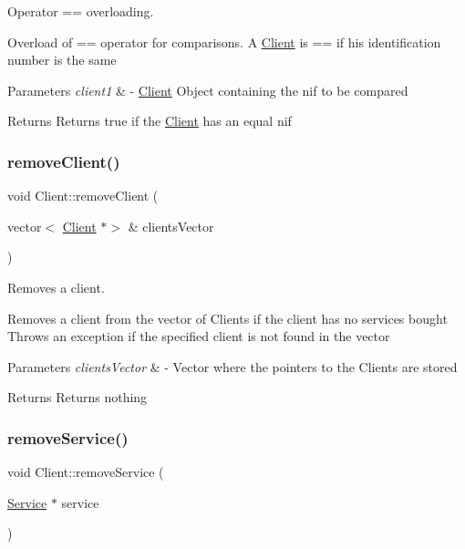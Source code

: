 Operator == overloading. 

Overload of == operator for comparisons. A \hyperlink{class_client}{Client} is == if his identification number is the same


\begin{DoxyParams}{Parameters}
{\em client1} & -\/ \hyperlink{class_client}{Client} Object containing the nif to be compared \\
\hline
\end{DoxyParams}
\begin{DoxyReturn}{Returns}
Returns true if the \hyperlink{class_client}{Client} has an equal nif 
\end{DoxyReturn}
\mbox{\label{class_client_a7f845c33f4aa7b7081ae72d9a16c2d3f}} 
\subsubsection{\texorpdfstring{remove\+Client()}{removeClient()}}
{\footnotesize\ttfamily void Client\+::remove\+Client (\begin{DoxyParamCaption}\item[{vector$<$ \hyperlink{class_client}{Client} $\ast$$>$ \&}]{clients\+Vector }\end{DoxyParamCaption})}



Removes a client. 

Removes a client from the vector of Clients if the client has no services bought Throws an exception if the specified client is not found in the vector


\begin{DoxyParams}{Parameters}
{\em clients\+Vector} & -\/ Vector where the pointers to the Clients are stored \\
\hline
\end{DoxyParams}
\begin{DoxyReturn}{Returns}
Returns nothing 
\end{DoxyReturn}
\mbox{\label{class_client_a018c06770de617bb404151e499206355}} 
\subsubsection{\texorpdfstring{remove\+Service()}{removeService()}}
{\footnotesize\ttfamily void Client\+::remove\+Service (\begin{DoxyParamCaption}\item[{\hyperlink{class_service}{Service} $\ast$}]{service }\end{DoxyParamCaption})}



